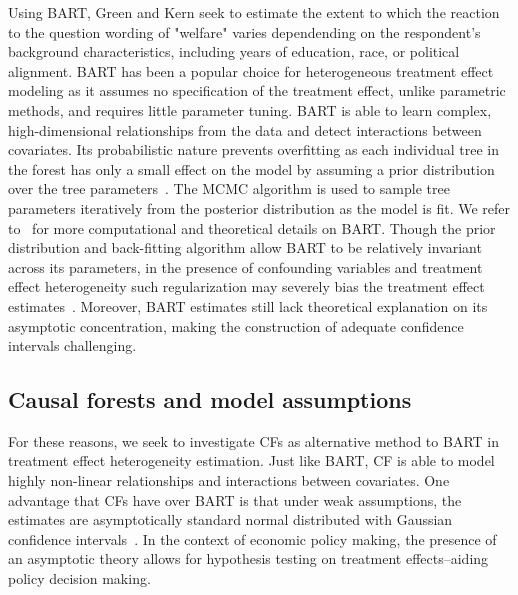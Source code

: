 \documentclass[12pt]{article}
\begin{document}
Using BART, Green and Kern seek to estimate the extent to which the reaction to
the question wording of "welfare" varies dependending on the respondent's
background characteristics, including years of education, race, or political
alignment. BART has been a popular choice for heterogeneous treatment effect
modeling as it assumes no specification of the treatment effect, unlike
parametric methods, and requires little parameter tuning. BART is able to learn
complex, high-dimensional relationships from the data and detect interactions
between covariates. Its probabilistic nature prevents overfitting as each
individual tree in the forest has only a small effect on the model by assuming a
prior distribution over the tree parameters~\cite{Chipman2010}. The MCMC
algorithm is used to sample tree parameters iteratively from the posterior
distribution as the model is fit. We refer to~\cite{Chipman2010} for more
computational and theoretical details on BART. Though the prior distribution and
back-fitting algorithm allow BART to be relatively invariant across its
parameters, in the presence of confounding variables and treatment effect
heterogeneity such regularization may severely bias the treatment effect
estimates~\cite{CarvalhoHahnMurray}. Moreover, BART estimates still lack
theoretical explanation on its asymptotic concentration, making the construction
of adequate confidence intervals challenging. 

\subsection{Causal forests and model assumptions} 
For these reasons, we seek to investigate CFs as alternative method to BART in
treatment effect heterogeneity estimation. Just like BART, CF is able to model
highly non-linear relationships and interactions between covariates. One
advantage that CFs have over BART is that under weak assumptions, the estimates
are asymptotically standard normal distributed with Gaussian confidence
intervals~\cite{atheywager2019}. In the context of economic policy making, the
presence of an asymptotic theory allows for hypothesis testing on treatment
effects--aiding policy decision making. \\
\end{document}
